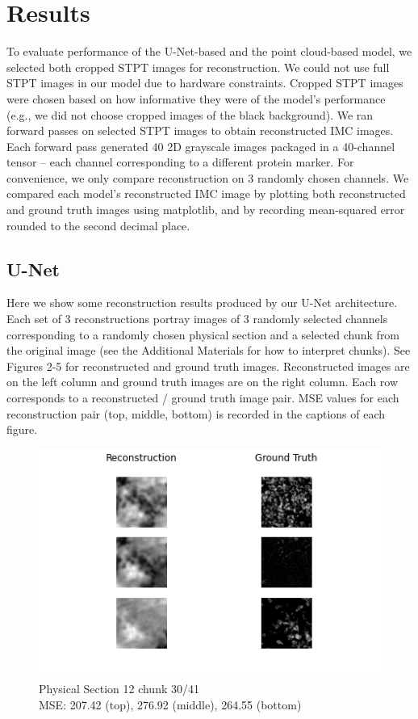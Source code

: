 \documentclass[10pt,twocolumn,letterpaper]{article}
\begin{document}
\section{Results}

To evaluate performance of the U-Net-based and the point cloud-based model, we selected both cropped STPT images for reconstruction. We could not use full STPT images in our model due to hardware constraints. Cropped STPT images were chosen based on how informative they were of the model’s performance (e.g., we did not choose cropped images of the black background). We ran forward passes on selected STPT images to obtain reconstructed IMC images. Each forward pass generated 40 2D grayscale images packaged in a 40-channel tensor – each channel corresponding to a different protein marker. For convenience, we only compare reconstruction on 3 randomly chosen channels. We compared each model’s reconstructed IMC image by plotting both reconstructed and ground truth images using matplotlib, and by recording mean-squared error rounded to the second decimal place.


\subsection{U-Net}
Here we show some reconstruction results produced by our U-Net architecture. Each set of 3 reconstructions portray images of 3 randomly selected channels corresponding to a randomly chosen physical section and a selected chunk from the original image (see the Additional Materials for how to interpret chunks). See Figures 2-5 for reconstructed and ground truth images. Reconstructed images are on the left column and ground truth images are on the right column. Each row corresponds to a reconstructed / ground truth image pair. MSE values for each reconstruction pair (top, middle, bottom) is recorded in the captions of each figure.  

\begin{figure}[!h]
	\centering
	\captionsetup{justification=centering}
		\hspace*{-1cm}
		\includegraphics[scale=0.65]{../figures/12_30_41.png}
	\caption{Physical Section 12 chunk 30/41\\ MSE: 207.42 (top), 276.92 (middle), 264.55 (bottom)}		
\end{figure}
\end{document}
